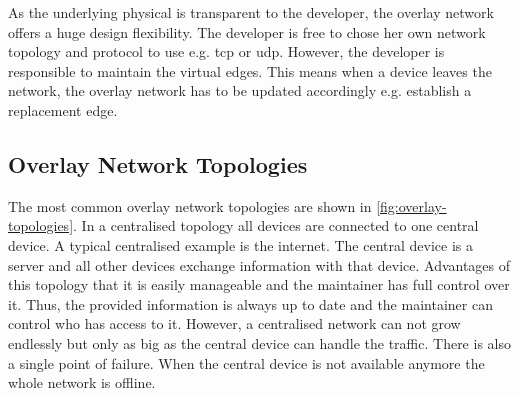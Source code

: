 As the underlying physical is transparent to the developer, the overlay network offers a huge design flexibility. The developer is free to chose her own network topology and protocol to use e.g. \gls{tcp} or \gls{udp}. However, the developer is responsible to maintain the virtual edges. This means when a device leaves the network, the overlay network has to be updated accordingly e.g. establish a replacement edge.

\subsection{Overlay Network Topologies}
The most common overlay network topologies are shown in \cref{fig:overlay-topologies}. In a centralised topology all devices are connected to one central device. A typical centralised example is the internet. The central device is a server and all other devices exchange information with that device. Advantages of this topology that it is easily manageable and the maintainer has full control over it. Thus, the provided information is always up to date and the maintainer can control who has access to it. However, a centralised network can not grow endlessly but only as big as the central device can handle the traffic. There is also a single point of failure. When the central device is not available anymore the whole network is offline.

